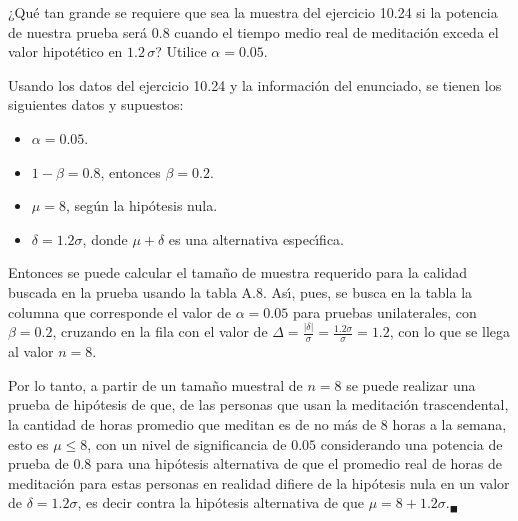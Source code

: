 \begin{enunciado}
 ¿Qu\'e tan grande se requiere que sea la muestra del ejercicio 10.24 si la potencia de nuestra prueba ser\'a $0.8$ cuando el tiempo medio real de meditaci\'on exceda el valor hipot\'etico en $1.2\,\sigma$? Utilice $\alpha = 0.05$.
\end{enunciado}

\begin{solucion}
 Usando los datos del ejercicio 10.24
 y la informaci\'on del enunciado,
 se tienen los siguientes datos y supuestos:
 \begin{itemize}
  \item $\alpha = 0.05$.
  \item $1 - \beta = 0.8$, entonces $\beta = 0.2$.
  \item $\mu = 8$, seg\'un la hip\'otesis nula.
  \item $\delta = 1.2\sigma$,
  donde $\mu + \delta$ es una alternativa espec\'{\i}fica.
 \end{itemize}
 Entonces se puede calcular el tama\~no de muestra
 requerido para la calidad buscada en la prueba
 usando la tabla A.8.
 As\'{\i}, pues, se busca en la tabla la columna
 que corresponde el valor de $\alpha=0.05$ para pruebas unilaterales,
 con $\beta = 0.2$, cruzando en la fila
 con el valor de $\Delta = \frac{|\delta|}{\sigma} = \frac{1.2\sigma}{\sigma} = 1.2$,
 con lo que se llega al valor $n = 8$.
 \par 
 Por lo tanto, a partir de un tama\~no muestral de $n = 8$ se puede realizar una prueba
 de hip\'otesis de que, de las personas que usan la meditaci\'on trascendental,
 la cantidad de horas promedio que meditan es de no m\'as de 8 horas a la semana,
 esto es $\mu \leq 8$, con un nivel de significancia de $0.05$
 considerando una potencia de prueba de $0.8$ para una hip\'otesis alternativa
 de que el promedio real de horas de meditaci\'on para estas personas
 en realidad difiere de la hip\'otesis nula en un valor de $\delta = 1.2\sigma$,
 es decir contra la hip\'otesis alternativa
 de que $\mu = 8 + 1.2\sigma$.${}_{\blacksquare}$
\end{solucion}
